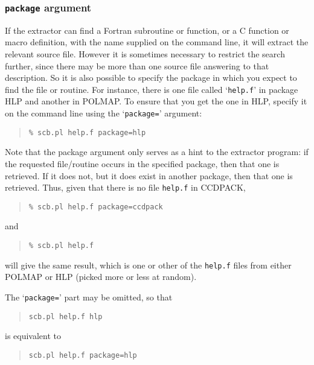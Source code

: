 \documentclass[twoside,11pt]{article}
\newcommand{\xlabel}[1]{}
\renewcommand{\_}{\texttt{\symbol{95}}}
\begin{document}
\subsubsection{\xlabel{sec:extract-package}\label{sec:extract-package}{\tt package} argument}

If the extractor can find a Fortran subroutine or function, 
or a C function or macro definition, with the name supplied on
the command line, it will extract the relevant source file.
However it is sometimes necessary to restrict the search
further, since there may be more than one source file answering
to that description.  So it is also possible to specify the
package in which you expect to find the file or routine. 
For instance, there is one file called `{\tt help.f}' in
package HLP and another in POLMAP.  
To ensure that you get the one in HLP, specify it on the 
command line using the `{\tt package=}' argument:
\begin{quote}
\begin{verbatim}
% scb.pl help.f package=hlp
\end{verbatim}
\end{quote}
Note that the package argument only serves as a hint to the
extractor program: if the requested file/routine occurs in the
specified package, then that one is retrieved.  If it does not,
but it does exist in another package, then that one is retrieved.
Thus, given that there is no file {\tt help.f} in CCDPACK,
\begin{quote}
\begin{verbatim}
% scb.pl help.f package=ccdpack
\end{verbatim}
\end{quote}
and 
\begin{quote}
\begin{verbatim}
% scb.pl help.f
\end{verbatim}
\end{quote}
will give the same result, which is one or other of the {\tt help.f}
files from either POLMAP or HLP (picked more or less at random).

The `{\tt package=}' part may be omitted, so that 
\begin{quote}
\begin{verbatim}
scb.pl help.f hlp
\end{verbatim}
\end{quote}
is equivalent to 
\begin{quote}
\begin{verbatim}
scb.pl help.f package=hlp
\end{verbatim}
\end{quote}
\end{document}
